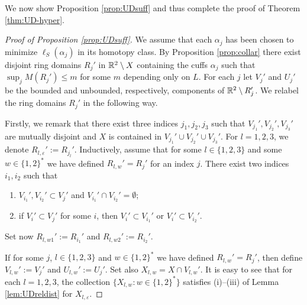 \documentclass{amsart}
\begin{document}
We now show Proposition \ref{prop:UDsuff} and thus complete the proof of Theorem \ref{thm:UD-hyper}.



\begin{proof}[{Proof of Proposition \ref{prop:UDsuff}}]
We assume that each $\alpha_j$ has been chosen to minimize $\ell_S (\alpha_j)$ in its homotopy class. By Proposition \ref{prop:collar} there exist disjoint ring domains $R_j'$ in $\mathbb{R}^2\setminus X$ containing the cuffs $\alpha_j$ such that $\sup_j M(R_j') \leq m$ for some $m$ depending only on $L$. For each $j$ let $V_j'$ and $U_j'$ be the bounded and unbounded, respectively, components of $\mathbb{R}^2\setminus R_j'$. We relabel the ring domains $R_j'$ in the following way.

Firstly, we remark that there exist three indices $j_1,j_2,j_3$ such that $V_{j_1}',V_{j_2}',V_{j_3}'$ are mutually disjoint and $X$ is contained in $V_{j_1}'\cup V_{j_2}'\cup V_{j_3}'$. For $l=1,2,3$, we denote $R_{l,\varepsilon}':=R_{j_l}'$. Inductively, assume that for some $l\in \{1,2,3\}$ and some $w\in\{1,2\}^*$ we have defined $R_{l,w}' = R_{j}'$ for an index $j$. There exist two indices $i_1,i_2$ such that 
\begin{enumerate}
\item $V_{i_1}',V_{i_2}' \subset V_j'$ and $V_{i_1}'\cap V_{i_2}' = \emptyset$; 
\item if $V_i' \subset V_j'$ for some $i$, then $V_i'\subset V_{i_1}'$ or $V_i' \subset V_{i_2}'$.
\end{enumerate}
Set now $R_{l,w1}':=R_{i_1}'$ and $R_{l,w2}':=R_{i_2}'$. 

If for some $j$, $l\in\{1,2,3\}$ and $w\in \{1,2\}^*$ we have defined $R_{l,w}' = R_j'$, then define $V_{l,w}':=V_j'$ and $U_{l,w}':=U_j'$. Set also $X_{l,w} = X\cap V_{l,w}'$. It is easy to see that for each $l=1,2,3$, the collection $\{X_{l,w}: w\in\{1,2\}^*\}$ satisfies (i)--(iii) of Lemma \ref{lem:UDreldist} for $X_{l,\varepsilon}$.


\end{proof}
\end{document}
